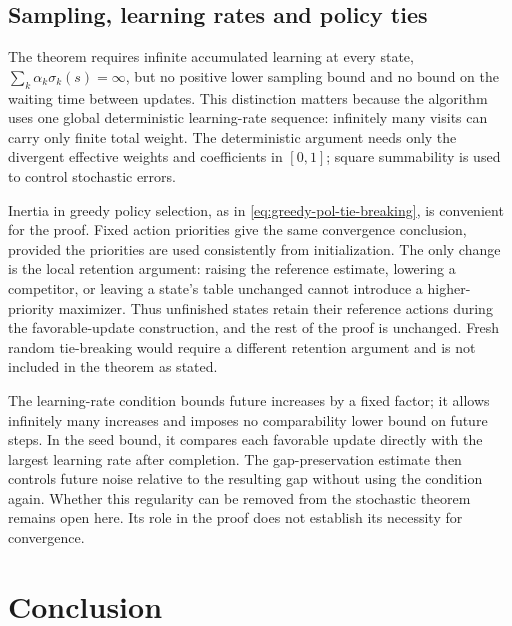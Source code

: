 %
%
%
%
%
%
%
%
%
%
%
%
%
%
%
%
%
%
%
%
%
%
%
%
%
%
%
%
%

%
%


%
%
%
%
%
%
%
%
%
%

%
%


%
%
\subsection{Sampling, learning rates and policy ties}
\label{sec: relaxing conditions}
The theorem requires infinite accumulated learning at every state, $\sum_k\alpha_k\sigma_k(s)=\infty$, but no positive lower sampling bound and no bound on the waiting time between updates. This distinction matters because the algorithm uses one global deterministic learning-rate sequence: infinitely many visits can carry only finite total weight. The deterministic argument needs only the divergent effective weights and coefficients in $[0,1]$; square summability is used to control stochastic errors.

Inertia in greedy policy selection, as in \eqref{eq:greedy-pol-tie-breaking}, is convenient for the proof. Fixed action priorities give the same convergence conclusion, provided the priorities are used consistently from initialization. The only change is the local retention argument: raising the reference estimate, lowering a competitor, or leaving a state's table unchanged cannot introduce a higher-priority maximizer. Thus unfinished states retain their reference actions during the favorable-update construction, and the rest of the proof is unchanged. Fresh random tie-breaking would require a different retention argument and is not included in the theorem as stated.

The learning-rate condition bounds future increases by a fixed factor; it allows infinitely many increases and imposes no comparability lower bound on future steps. In the seed bound, it compares each favorable update directly with the largest learning rate after completion. The gap-preservation estimate then controls future noise relative to the resulting gap without using the condition again. Whether this regularity can be removed from the stochastic theorem remains open here. Its role in the proof does not establish its necessity for convergence.

\section{Conclusion}


%


